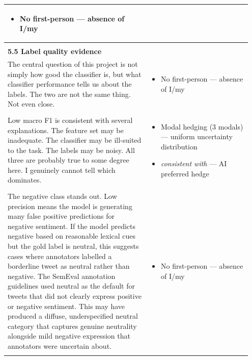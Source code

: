 \documentclass[11pt]{article}
\begin{document}
\begin{longtable}{|p{0.55\linewidth}|p{0.40\linewidth}|}
\begin{itemize}[leftmargin=1em,itemsep=1pt,topsep=1pt,parsep=0pt]
  \item No first-person --- absence of I/my
\end{itemize} \\[2pt]
\hline
\rule{0pt}{3.5cm} & \\
\hline
\textbf{5.5 Label quality evidence}\\[4pt]
The central question of this project is not simply how good the classifier is, but what classifier performance tells us about the labels. The two are not the same thing. Not even close. & \begin{itemize}[leftmargin=1em,itemsep=1pt,topsep=1pt,parsep=0pt]
  \item No first-person --- absence of I/my
\end{itemize} \\[2pt]
\hline
\rule{0pt}{3.5cm} & \\
\hline
Low macro F1 is consistent with several explanations. The feature set may be inadequate. The classifier may be ill-suited to the task. The labels may be noisy. All three are probably true to some degree here. I genuinely cannot tell which dominates. & \begin{itemize}[leftmargin=1em,itemsep=1pt,topsep=1pt,parsep=0pt]
  \item Modal hedging (3 modals) --- uniform uncertainty distribution
  \item \textit{consistent with} --- AI preferred hedge
\end{itemize} \\[2pt]
\hline
\rule{0pt}{3.5cm} & \\
\hline
The negative class stands out. Low precision means the model is generating many false positive predictions for negative sentiment. If the model predicts negative based on reasonable lexical cues but the gold label is neutral, this suggests cases where annotators labelled a borderline tweet as neutral rather than negative. The SemEval annotation guidelines used neutral as the default for tweets that did not clearly express positive or negative sentiment. This may have produced a diffuse, underspecified neutral category that captures genuine neutrality alongside mild negative expression that annotators were uncertain about. & \begin{itemize}[leftmargin=1em,itemsep=1pt,topsep=1pt,parsep=0pt]
  \item No first-person --- absence of I/my
\end{itemize} \\[2pt]
\hline
\rule{0pt}{3.5cm} & \\

\end{longtable}
\end{document}
